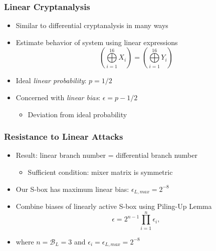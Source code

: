 \begin{frame}
\frametitle{Linear Cryptanalysis}
\begin{itemize}
  \item Similar to differential cryptanalysis in many ways
  \item Estimate behavior of system using linear expressions
  \begin{equation*}
  \left( \bigoplus\limits_{i=1}^{16} X_i \right) = \left( \bigoplus\limits_{i=1}^{16} Y_i \right)
  \end{equation*}
  \item Ideal \emph{linear probability}: $p = 1/2$
  \item Concerned with \emph{linear bias}: $\epsilon = p - 1/2$
  \begin{itemize}
    \item Deviation from ideal probability
  \end{itemize}
\end{itemize}
\end{frame}

\begin{frame}
\frametitle{Resistance to Linear Attacks}
\begin{itemize}
  \item Result: linear branch number = differential branch number
  \begin{itemize}
    \item Sufficient condition: mixer matrix is symmetric \cite{Daemen2002_DesignOfRijndael}
  \end{itemize}
  \item Our S-box has maximum linear bias: $\epsilon_{L,max} = 2^{-8}$
  \item Combine biases of linearly active S-box using Piling-Up Lemma
  \begin{equation*}
  \epsilon = 2^{n-1} \prod\limits_{i = 1}^n \epsilon_i,
  \end{equation*}
  \item where $n = \mathcal{B}_L = 3$ and $\epsilon_i = \epsilon_{L,max} = 2^{-8}$
\end{itemize}
\end{frame}

